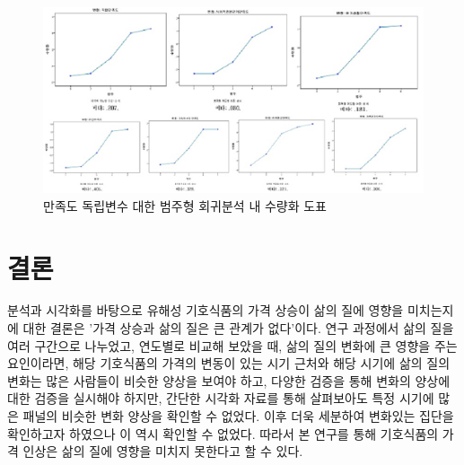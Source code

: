 \documentclass[a4paper, amsmath]{oblivoir}
\begin{document}
\begin{figure}[!h]
    \begin{center}    
    \includegraphics[width=0.8\linewidth]{./figz/image03.png}
    \end{center}    
    \caption{만족도 독립변수 대한 범주형 회귀분석 내 수량화 도표}    
    \label{fig:long}    
    \label{fig:onecol}    
\end{figure}

\section{결론}
분석과 시각화를 바탕으로 유해성 기호식품의 가격 상승이 삶의 질에 영향을 미치는지에 대한 결론은 '가격 상승과 삶의 질은 큰 관계가 없다'이다. 
연구 과정에서 삶의 질을 여러 구간으로 나누었고, 연도별로 비교해 보았을 때, 삶의 질의 변화에 큰 영향을 주는 요인이라면, 해당 기호식품의 가격의 변동이 있는 시기 근처와 해당 시기에 삶의 질의 변화는 많은 사람들이 비슷한 양상을 보여야 하고, 다양한 검증을 통해 변화의 양상에 대한 검증을 실시해야 하지만, 간단한 시각화 자료를 통해 살펴보아도 특정 시기에 많은 패널의 비슷한 변화 양상을 확인할 수 없었다.
이후 더욱 세분하여 변화있는 집단을 확인하고자 하였으나 이 역시 확인할 수 없었다. 따라서 본 연구를 통해 기호식품의 가격 인상은 삶의 질에 영향을 미치지 못한다고 할 수 있다. 



\end{document}
